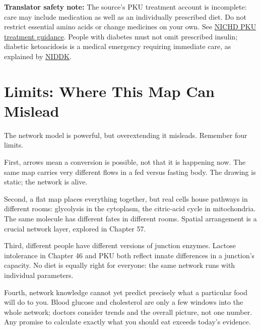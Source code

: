 \textbf{Translator safety note:} The source's PKU treatment account is incomplete: care may include medication as well as an individually prescribed diet. Do not restrict essential amino acids or change medicines on your own. See \href{https://www.nichd.nih.gov/health/topics/pku/conditioninfo/treatments}{NICHD PKU treatment guidance}. People with diabetes must not omit prescribed insulin; diabetic ketoacidosis is a medical emergency requiring immediate care, as explained by \href{https://www.niddk.nih.gov/health-information/diabetes/overview/managing-diabetes}{NIDDK}.

\section{Limits: Where This Map Can Mislead}

The network model is powerful, but overextending it misleads. Remember four limits.

First, arrows mean a conversion is possible, not that it is happening now. The same map carries very different flows in a fed versus fasting body. The drawing is static; the network is alive.

Second, a flat map places everything together, but real cells house pathways in different rooms: glycolysis in the cytoplasm, the citric-acid cycle in mitochondria. The same molecule has different fates in different rooms. Spatial arrangement is a crucial network layer, explored in Chapter 57.

Third, different people have different versions of junction enzymes. Lactose intolerance in Chapter 46 and PKU both reflect innate differences in a junction's capacity. No diet is equally right for everyone: the same network runs with individual parameters.

Fourth, network knowledge cannot yet predict precisely what a particular food will do to you. Blood glucose and cholesterol are only a few windows into the whole network; doctors consider trends and the overall picture, not one number. Any promise to calculate exactly what you should eat exceeds today's evidence.


